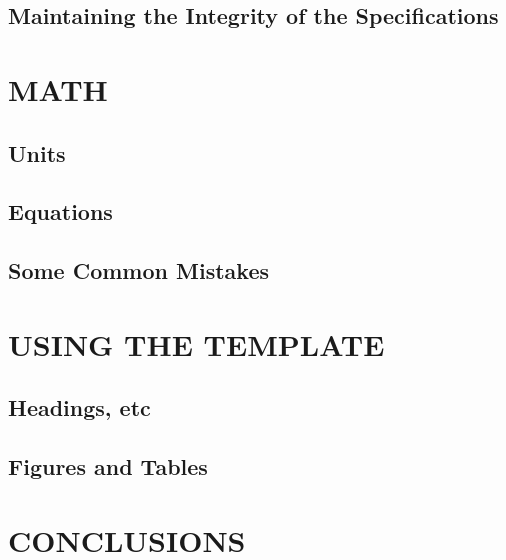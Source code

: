 \documentclass[letterpaper, 10 pt, conference]{ieeeconf}  %
\begin{document}
\subsection{Maintaining the Integrity of the Specifications}

\section{MATH}

\subsection{Units}

\subsection{Equations}

\subsection{Some Common Mistakes}


\section{USING THE TEMPLATE}


\subsection{Headings, etc}

\subsection{Figures and Tables}


\section{CONCLUSIONS}


\addtolength{\textheight}{-12cm}   %















\end{document}
